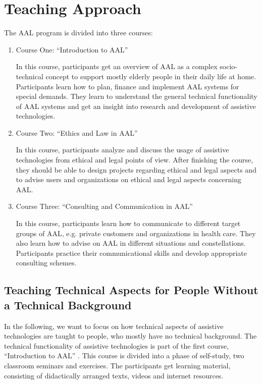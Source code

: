 \documentclass[runningheads,a4paper]{llncs}
\begin{document}
\section{Teaching Approach}\label{approach}

The AAL program is divided into three courses:

\begin{enumerate}
\item Course One: ``Introduction to AAL''

In this course, participants get an overview of AAL as a complex socio-technical concept to support mostly elderly people in their daily life at home. Participants learn how to plan, finance and implement AAL systems for special demands. They learn to understand the general technical functionality of AAL systems and get an insight into research and development of assistive technologies.
\item Course Two: ``Ethics and Law in AAL''

In this course, participants analyze and discuss the usage of assistive technologies from ethical and legal points of view. After finishing the course, they should be able to design projects regarding ethical and legal aspects and to advise users and organizations on ethical and legal aspects concerning AAL.
\item Course Three: ``Consulting and Communication in AAL''

In this course, participants learn how to communicate to different target groups of AAL, e.g. private customers and organizations in health care. They also learn how to advise on AAL in different situations and constellations. Participants practice their communicational skills and develop appropriate consulting schemes.
\end{enumerate}

\subsection{Teaching Technical Aspects for People Without a Technical Background}

In the following, we want to focus on how technical aspects of assistive technologies are taught to people, who mostly have no technical background. The technical functionality of assistive technologies is part of the first course, ``Introduction to AAL'' \cite{HKG14}. This course is divided into a phase of self-study, two classroom seminars and exercises. The participants get learning material, consisting of didactically arranged texts, videos and internet resources. 
\end{document}
